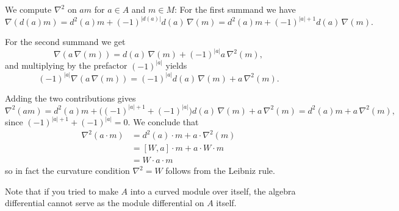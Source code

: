 \documentclass[12pt]{article}
\begin{document}
\begin{remark}
We compute $\nabla^2$ on $am$ for $a \in A$ and $m \in M$:
For the first summand we have
\[
\nabla(d(a)m)=d^2(a)m+(-1)^{|d(a)|}d(a)\,\nabla(m)
= d^2(a)m+(-1)^{|a|+1}d(a)\,\nabla(m).
\]

For the second summand we get
\[
\nabla(a\,\nabla(m))=d(a)\,\nabla(m)+(-1)^{|a|}a\,\nabla^2(m),
\]
and multiplying by the prefactor $(-1)^{|a|}$ yields
\[
(-1)^{|a|}\nabla(a\,\nabla(m)) = (-1)^{|a|}d(a)\,\nabla(m) + a\,\nabla^2(m).
\]

Adding the two contributions gives
\[
\nabla^2(am)
= d^2(a)m +\big((-1)^{|a|+1}+(-1)^{|a|}\big)d(a)\,\nabla(m) + a\,\nabla^2(m)
= d^2(a)m + a\,\nabla^2(m),
\]
since $(-1)^{|a|+1}+(-1)^{|a|}=0$. We conclude that
\begin{align*}
\nabla^2(a \cdot m) &= d^2(a) \cdot m + a \cdot \nabla^2(m) \\
&= [W,a] \cdot m + a \cdot W \cdot m \\
&= W \cdot a \cdot m
\end{align*}
so in fact the curvature condition $\nabla^2 = W$ follows from the Leibniz rule.

Note that if you tried to make $A$ into a curved module 
over itself, the algebra differential cannot serve as the module differential on $A$ itself.
\end{remark}
\end{document}
